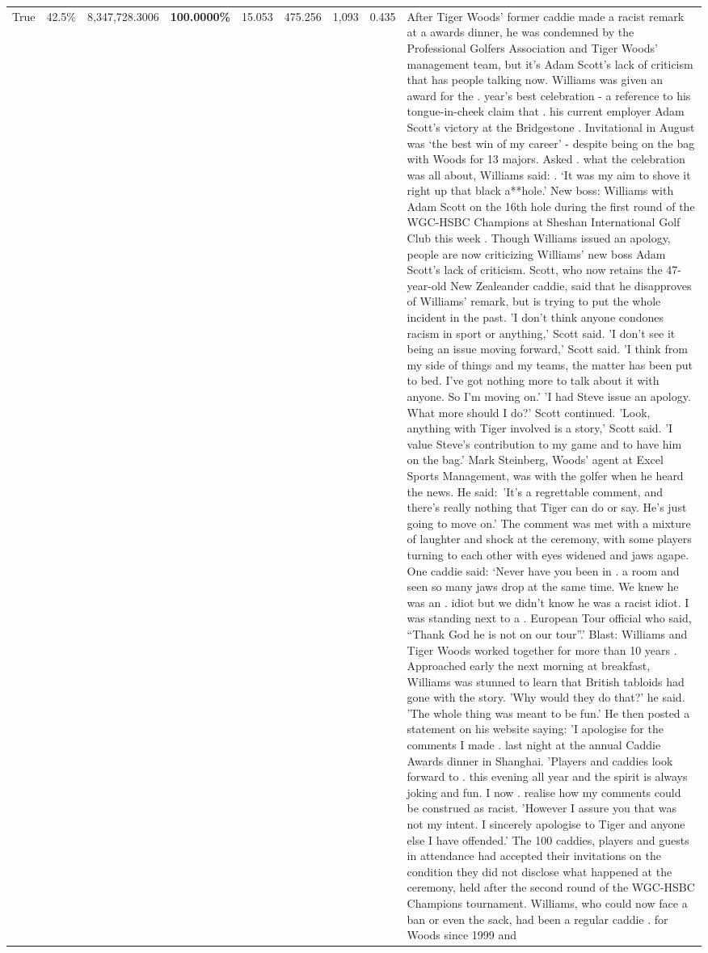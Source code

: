 \begin{table}[H]
\begin{tabular}{lllrlllll}
True & 42.5\% & 8,347,728.3006 & \bfseries \color{red} 100.0000\% & 15.053 & 475.256 & 1,093 & 0.435 & After Tiger Woods' former caddie made a racist remark at a awards dinner, he was condemned by the Professional Golfers Association and Tiger Woods' management team, but it's Adam Scott's lack of criticism that has people talking now. Williams was given an award for the . year’s best celebration - a reference to his tongue-in-cheek claim that . his current employer Adam Scott’s victory at the Bridgestone . Invitational in August was ‘the best win of my career’ - despite being on the bag with Woods for 13 majors. Asked . what the celebration was all about, Williams said: . ‘It was my aim to shove it right up that black a**hole.’ New boss: Williams with Adam Scott  on the 16th hole during the first round of the WGC-HSBC Champions at Sheshan International Golf Club this week . Though Williams issued an apology, people are now criticizing Williams' new boss Adam Scott's lack of criticism. Scott, who now retains the 47-year-old New Zealeander caddie, said that he disapproves of Williams' remark, but is trying to put the whole incident in the past. 'I don't think anyone condones racism in sport or anything,' Scott said. 'I don't see it being an issue moving forward,' Scott said. 'I think from my side of things and my teams, the matter has been put to bed. I've got nothing more to talk about it with anyone. So I'm moving on.' 'I had Steve issue an apology. What more should I do?' Scott continued. 'Look, anything with Tiger involved is a story,' Scott said. 'I value Steve's contribution to my game and to have him on the bag.' Mark Steinberg, Woods' agent at Excel Sports Management, was with the golfer when he heard the news. He said: 'It's a regrettable comment, and there's really nothing that Tiger can do or say. He's just going to move on.' The comment was met with a mixture of laughter and shock at the ceremony, with some players turning to each other with eyes widened and jaws agape. One caddie said: ‘Never have you been in . a room and seen so many jaws drop at the same time. We knew he was an . idiot but we didn’t know he was a racist idiot. I was standing next to a . European Tour official who said, “Thank God he is not on our tour”.’ Blast: Williams and Tiger Woods worked together for more than 10 years . Approached early the next morning at breakfast, Williams was stunned to learn that British tabloids had gone with the story. 'Why would they do that?' he said. 'The whole thing was meant to be fun.' He then posted a statement on his website saying: 'I apologise for the comments I made . last night at the annual Caddie Awards dinner in Shanghai. 'Players and caddies look forward to . this evening all year and the spirit is always joking and fun. I now . realise how my comments could be construed as racist. 'However I assure you that was not my intent. I sincerely apologise to Tiger and anyone else I have offended.' The 100 caddies, players and guests in attendance had accepted their invitations on the condition they did not disclose what happened at the ceremony, held after the second round of the WGC-HSBC Champions tournament. Williams, who could now face a ban or even the sack, had been a regular caddie . for Woods since 1999 and 
\end{tabular}
\end{table}
